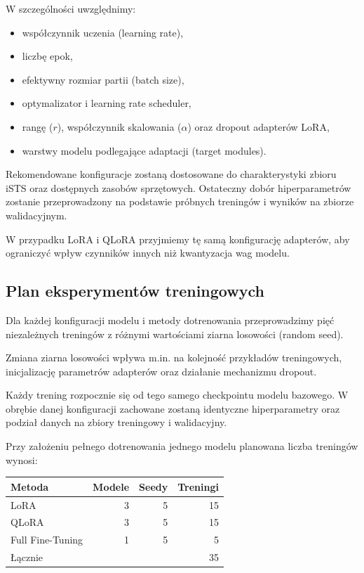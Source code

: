 \documentclass[a4paper,10pt]{article}
\begin{document}
W szczególności uwzględnimy:

\begin{itemize}
    \item współczynnik uczenia (learning rate),
    \item liczbę epok,
    \item efektywny rozmiar partii (batch size),
    \item optymalizator i learning rate scheduler,
    \item rangę ($r$), współczynnik skalowania
    ($\alpha$) oraz dropout adapterów LoRA,
    \item warstwy modelu podlegające adaptacji
    (target modules).
\end{itemize}

Rekomendowane konfiguracje zostaną dostosowane do
charakterystyki zbioru iSTS oraz dostępnych zasobów
sprzętowych. Ostateczny dobór hiperparametrów
zostanie przeprowadzony na podstawie próbnych
treningów i wyników na zbiorze walidacyjnym.

W przypadku LoRA i QLoRA przyjmiemy tę samą
konfigurację adapterów, aby ograniczyć wpływ
czynników innych niż kwantyzacja wag modelu.

\subsection{Plan eksperymentów treningowych}

Dla każdej konfiguracji modelu i metody dotrenowania
przeprowadzimy pięć niezależnych treningów z różnymi
wartościami ziarna losowości (random seed).

Zmiana ziarna losowości wpływa m.in. na kolejność
przykładów treningowych, inicjalizację parametrów
adapterów oraz działanie mechanizmu dropout.

Każdy trening rozpocznie się od tego samego checkpointu
modelu bazowego. W obrębie danej konfiguracji zachowane
zostaną identyczne hiperparametry oraz podział danych
na zbiory treningowy i walidacyjny.

Przy założeniu pełnego dotrenowania jednego modelu
planowana liczba treningów wynosi:

\begin{center}
    \begin{tabular}{lrrr}
        \toprule
        Metoda & Modele & Seedy & Treningi \\
        \midrule
        LoRA             & 3 & 5 & 15 \\
        QLoRA            & 3 & 5 & 15 \\
        Full Fine-Tuning & 1 & 5 & 5  \\
        \midrule
        Łącznie          &   &   & 35 \\
        \bottomrule
    \end{tabular}
\end{center}
\end{document}
